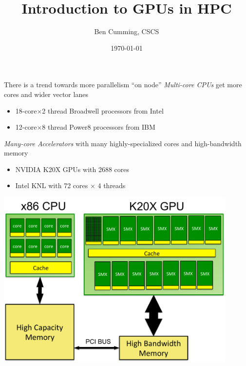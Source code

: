 \documentclass[aspectratio=43]{beamer}
\author{Ben Cumming, CSCS}
\title{Introduction to GPUs in HPC}
\subtitle{}
\date{\today}
\begin{document}
\cscstitle


\begin{frame}[fragile]{}
    \begin{info}{There is a trend towards more parallelism ``on node''}
        \emph{Multi-core CPUs} get more cores and wider vector lanes
        \begin{itemize}
            \item 18-core$\times$2 thread Broadwell processors from Intel
            \item 12-core$\times$8 thread Power8 processors from IBM
        \end{itemize}
        \emph{Many-core Accelerators} with many highly-specialized cores and high-bandwidth memory
        \begin{itemize}
            \item NVIDIA K20X GPUs with 2688 cores
            \item Intel KNL with 72 cores $\times$ 4 threads
        \end{itemize}
    \end{info}

\end{frame}

\begin{frame}[fragile]{}
    \begin{center}
        \includegraphics[width=0.9\textwidth]{./images/node.pdf}
    \end{center}
\end{frame}
\end{document}
